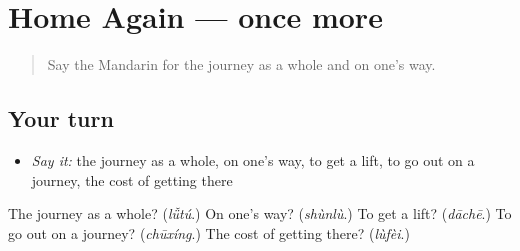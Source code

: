 \section[(dialogue)]{Home Again — once more}

\label{lesson:ZH-R429-review-final-429}



\begin{quote}
Say the Mandarin for the journey as a whole and on one's way.
\end{quote}

\subsection*{Your turn}
\begin{itemize}
\raggedright
  \item \emph{Say it:} the journey as a whole, on one's way, to get a lift, to go out on a journey, the cost of getting there
\end{itemize}

\begin{tcolorbox}[breakable,colback=teal!4,colframe=teal!35!black,title={Before you move on}]
The journey as a whole? (\emph{lǚtú}.) On one's way? (\emph{shùnlù}.) To get a lift? (\emph{dāchē}.) To go out on a journey? (\emph{chūxíng}.) The cost of getting there? (\emph{lùfèi}.)
\end{tcolorbox}
